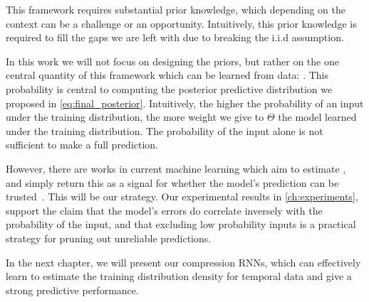 \documentclass[../main.tex]{subfiles}
\begin{document}
This framework requires substantial prior knowledge, which depending on the context can be a challenge or an opportunity. Intuitively, this prior knowledge is required to fill the gaps we are left with due to breaking the i.i.d assumption. 

In this work we will not focus on designing the priors, but rather on the one central quantity of this framework which can be learned from data: . This probability is central to computing the posterior predictive distribution we proposed in \cref{eq:final_posterior}. Intuitively, the higher the probability of an input under the training distribution, the more weight we give to $\Theta$ the model learned under the training distribution. The probability of the input alone is not sufficient to make a full prediction.

However, there are works in current machine learning which aim to estimate , and simply return this as a signal for whether the model's prediction can be trusted~\citep{vasilev2018q, pidhorskyi2018generative}. This will be our strategy. Our experimental results in \cref{ch:experiments}, support the claim that the model's errors do correlate inversely with the probability of the input, and that excluding low probability inputs is a practical strategy for pruning out unreliable predictions. 

In the next chapter, we will present our compression RNNs, which can effectively learn to estimate the training distribution density for temporal data and give a strong predictive performance.  

  




\end{document}
